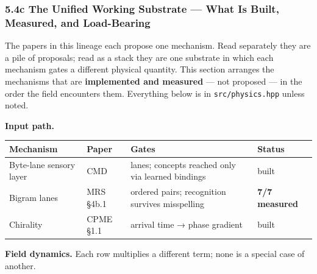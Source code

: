 \documentclass[
  11pt,
  a4paper,
]{article}
\begin{document}
\subsubsection{5.4c The Unified Working Substrate --- What Is Built,
Measured, and
Load-Bearing}\label{c-the-unified-working-substrate-what-is-built-measured-and-load-bearing}

The papers in this lineage each propose one mechanism. Read separately
they are a pile of proposals; read as a stack they are one substrate in
which each mechanism gates a different physical quantity. This section
arranges the mechanisms that are \textbf{implemented and measured} ---
not proposed --- in the order the field encounters them. Everything
below is in \texttt{src/physics.hpp} unless noted.

\textbf{Input path.}

\begin{longtable}[]{@{}
  >{\raggedright\arraybackslash}p{}
  >{\raggedright\arraybackslash}p{}
  >{\raggedright\arraybackslash}p{}
  >{\raggedright\arraybackslash}p{}@{}}
\toprule\noalign{}
\begin{minipage}[b]{\linewidth}\raggedright
Mechanism
\end{minipage} & \begin{minipage}[b]{\linewidth}\raggedright
Paper
\end{minipage} & \begin{minipage}[b]{\linewidth}\raggedright
Gates
\end{minipage} & \begin{minipage}[b]{\linewidth}\raggedright
Status
\end{minipage} \\
\midrule\noalign{}
\endhead
\bottomrule\noalign{}
\endlastfoot
Byte-lane sensory layer & CMD & 256 lanes; concepts reached only via
learned bindings & built \\
Bigram lanes & MRS §4b.1 & ordered pairs; recognition survives
misspelling & \textbf{7/7 measured} \\
Chirality & CPME §1.1 & arrival time → phase gradient & built \\
\end{longtable}

\textbf{Field dynamics.} Each row multiplies a different term; none is a
special case of another.
\end{document}
